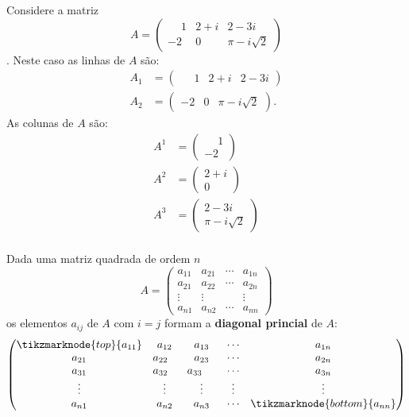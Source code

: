 \begin{exemplo}
	Considere a matriz
	\[
		A = \begin{pmatrix}
			\phantom{-} 1 & 2 + i & 2 - 3i\\
			-2 & 0 & \pi - i\sqrt{2}
		\end{pmatrix}
	\].
	Neste caso as linhas de $A$ são:
	\begin{align*}
		A_1 &= \begin{pmatrix}\phantom{-} 1 & 2 + i & 2 - 3i\end{pmatrix}\\
		A_2 &= \begin{pmatrix}-2 & 0 & \pi - i\sqrt{2}\end{pmatrix}.
	\end{align*}
	As colunas de $A$ são:
	\begin{align*}
		A^1 &= \begin{pmatrix}
			\phantom{-} 1\\-2
			\end{pmatrix}\\
		A^2 &= \begin{pmatrix}
			2 + i\\0
			\end{pmatrix}\\
		A^3 &= \begin{pmatrix}
			2 - 3i\\\pi - i\sqrt{2}
			\end{pmatrix}\\
	\end{align*}
\end{exemplo}

Dada uma matriz quadrada de ordem $n$
\[
	A = \begin{pmatrix}
		a_{11} & a_{21} & \cdots & a_{1n}\\
		a_{21} & a_{22} & \cdots & a_{2n}\\
		\vdots & \vdots & & \vdots\\
		a_{n1} & a_{n2} & \cdots & a_{nn}
	\end{pmatrix}
\]
os elementos $a_{ij}$ de $A$ com $i = j$ formam a \textbf{diagonal princial} de $A$:
\[
	\begin{pmatrix}
		\tikzmarknode{top}{a_{11}} & a_{12} & a_{13} & \cdots  & a_{1n}\\ 
		a_{21} & a_{22} \phantom{-} & a_{23} & \cdots  & a_{2n}\\ 
		a_{31} & a_{32}\phantom{-} & a_{33} \phantom{-1} & \cdots  & a_{3n}\\ 
		\vdots  & \vdots   & \vdots  & \vdots  & \vdots\\ 
		a_{n1} & a_{n2} & a_{n3} & \cdots  & \tikzmarknode{bottom}{a_{nn}}\\ 
	\end{pmatrix}
\]

